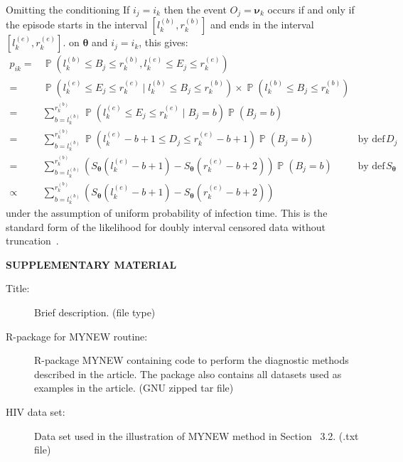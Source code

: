\documentclass[12pt]{article}
\DeclareMathOperator{\prob}{\mathbb{P}}
\renewcommand{\vec}[1]{\bm{#1}}
\begin{document}
Omitting the conditioning
If $i_j = i_k$ then the event $O_j = \vec{\nu}_k$ occurs if and only if the episode starts in the interval $[l^{(b)}_k, r^{(b)}_k]$ and ends in the interval $[l^{(e)}_k, r^{(e)}_k]$.
 on $\vec{\theta}$ and $i_j = i_k$, this gives:
\begin{align}
p_{ik}
=& \prob \left( l_k^{(b)} \leq B_{j} \leq r_k^{(b)}, l_k^{(e)} \leq E_{j} \leq r_k^{(e)} \right) \\
=& \prob \left( l_k^{(e)} \leq E_{j} \leq r_k^{(e)} \mid l_k^{(b)} \leq B_{j} \leq r_k^{(b)} \right) \times\prob \left( l_k^{(b)} \leq B_{j} \leq r_k^{(b)} \right) \\
=& \sum_{b = l_k^{(b)}}^{r_k^{(b)}} \prob \left( l_k^{(e)} \leq E_{j} \leq r_k^{(e)} \mid B_{j} = b \right) \prob \left(B_{j} = b \right) \\
=& \sum_{b = l_k^{(b)}}^{r_k^{(b)}} \prob \left( l_k^{(e)} - b + 1 \leq D_{j} \leq r_k^{(e)} - b + 1 \right) \prob \left(B_{j} = b \right) &\text{by def of $D_{j}$} \\
=& \sum_{b = l_k^{(b)}}^{r_k^{(b)}} \left( S_{\vec{\theta}}(l_k^{(e)} - b + 1) - S_{\vec{\theta}}(r_k^{(e)} - b + 2) \right) \prob \left(B_{j} = b \right) &\text{by def of $S_{\vec{\theta}}$} \\
\propto& \sum_{b = l_k^{(b)}}^{r_k^{(b)}} \left( S_{\vec{\theta}}(l_k^{(e)} - b + 1) - S_{\vec{\theta}}(r_k^{(e)} - b + 2) \right)
\label{perf-test:eq:pia}
\end{align}
under the assumption of uniform probability of infection time.
This is the standard form of the likelihood for doubly interval censored data without truncation~\citep[e.g.][]{sunEmpirical}.


\bigskip
\begin{center}
{\large\bf SUPPLEMENTARY MATERIAL}
\end{center}

\begin{description}

\item[Title:] Brief description. (file type)

\item[R-package for  MYNEW routine:] R-package MYNEW containing code to perform the diagnostic methods described in the article. The package also contains all datasets used as examples in the article. (GNU zipped tar file)

\item[HIV data set:] Data set used in the illustration of MYNEW method in Section~ 3.2. (.txt file)

\end{description}
\end{document}
